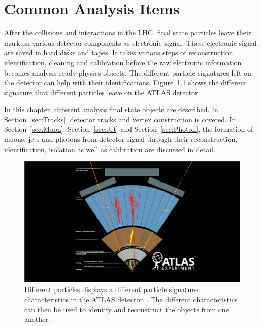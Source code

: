 \chapter{Common Analysis Items}
\label{chapter:common_analysis_objects}

After the collisions and interactions in the LHC, final state particles leave their mark on various detector components as electronic signal. These electronic signal are saved in hard disks and tapes. It takes various steps of reconstruction identification, cleaning and calibration before the raw electronic information becomes analysis-ready physics objects. The different particle signatures left on the detector can help
with their identifications. Figure~\ref{fig:particleSignature} shows the different signature that different particles leave on the ATLAS detector.

In this chapter, different analysis final state objects are described. In Section~\ref{sec:Tracks}, detector tracks and vertex construction is covered. In Section~\ref{sec:Muon}, Section~\ref{sec:Jet} and Section~\ref{sec:Photon}, the formation of muons, jets and photons from detector signal
through their reconstruction, identification, isolation as well as calibration are discussed in detail. 

\begin{figure}[!htb]
    \begin{center}
        \includegraphics[width=1.1\textwidth]{figures/common_ana/ParticleSignature}
        \caption{        
            Different particles displays a different particle signature characteristics in the ATLAS detector~\cite{Mehlhase:2770815}. The different characteristics can then be used to identify and reconstruct the objects from one another. 
        }
        \label{fig:particleSignature}
    \end{center}
\end{figure}

